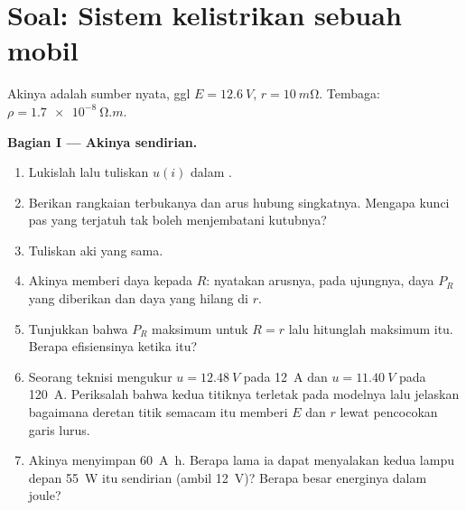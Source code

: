 \section{Soal: Sistem kelistrikan sebuah mobil}

\begin{problem}
\label{pb:b1:dc-circuits:1}
Akinya adalah sumber nyata, ggl $E = \qty{12.6}{V}$, 
$r = \qty{10}{m\ohm}$. Tembaga: $\rho = \qty{1.7e-8}{\ohm.m}$.

\medskip
\noindent\textbf{Bagian I --- Akinya sendirian.}
\begin{enumerate}
  \item Lukislah  lalu tuliskan $u(i)$ dalam .
  \item Berikan  rangkaian terbukanya dan arus hubung
        singkatnya. Mengapa kunci pas yang terjatuh tak boleh
        menjembatani kutubnya?
  \item Tuliskan  aki yang sama.
  \item Akinya memberi daya kepada  $R$: nyatakan arusnya,
         pada ujungnya, daya $P_R$ yang diberikan dan daya yang
        hilang di $r$.
  \item Tunjukkan bahwa $P_R$ maksimum untuk $R = r$ lalu hitunglah
        maksimum itu. Berapa efisiensinya ketika itu?
  \item Seorang teknisi mengukur $u = \qty{12.48}{V}$ pada \qty{12}{A}
        dan $u = \qty{11.40}{V}$ pada \qty{120}{A}. Periksalah bahwa
        kedua titiknya terletak pada modelnya lalu jelaskan bagaimana
        deretan titik semacam itu memberi $E$ dan $r$ lewat pencocokan
        garis lurus.
  \item Akinya menyimpan \qty{60}{A.h}. Berapa lama ia dapat menyalakan
        kedua lampu depan \qty{55}{W} itu sendirian (ambil \qty{12}{V})?
        Berapa besar energinya dalam joule?
\end{enumerate}


\end{problem}
